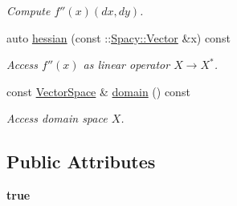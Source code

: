 \begin{DoxyCompactItemize}
\begin{DoxyCompactList}\small\item\em Compute $f''(x)(dx,dy)$. \end{DoxyCompactList}\item 
auto \hyperlink{classSpacy_1_1dealII_1_1C2FunGFunctional_3_01FunGFunctional_00_01dim_00_01VariableDim_3_01variable__dims_8_8_8_4_01_4_a60041dd721e5bd7f530428699cacc822}{hessian} (const \-::\hyperlink{classSpacy_1_1Vector}{Spacy\-::\-Vector} \&x) const 
\begin{DoxyCompactList}\small\item\em Access $f''(x)$ as linear operator $X\rightarrow X^*$. \end{DoxyCompactList}\item 
\hypertarget{classSpacy_1_1FunctionalBase_a2d3397deb9fa1ad85ed04e37a03b3aa6}{const \hyperlink{classSpacy_1_1VectorSpace}{Vector\-Space} \& \hyperlink{classSpacy_1_1FunctionalBase_a2d3397deb9fa1ad85ed04e37a03b3aa6}{domain} () const }\label{classSpacy_1_1FunctionalBase_a2d3397deb9fa1ad85ed04e37a03b3aa6}

\begin{DoxyCompactList}\small\item\em Access domain space $X$. \end{DoxyCompactList}\end{DoxyCompactItemize}
\subsection*{Public Attributes}
\begin{DoxyCompactItemize}
\item 
\hypertarget{classSpacy_1_1dealII_1_1C2FunGFunctional_3_01FunGFunctional_00_01dim_00_01VariableDim_3_01variable__dims_8_8_8_4_01_4_a6dada6a40f6597fc047d61f299004b4a}{{\bfseries true}}\label{classSpacy_1_1dealII_1_1C2FunGFunctional_3_01FunGFunctional_00_01dim_00_01VariableDim_3_01variable__dims_8_8_8_4_01_4_a6dada6a40f6597fc047d61f299004b4a}

\end{DoxyCompactItemize}


